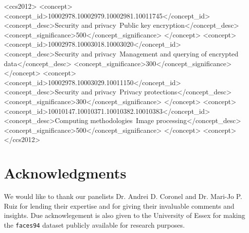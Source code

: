 \documentclass{sig-alternate-05-2015}
\begin{document}
%
%
\begin{CCSXML}
  <ccs2012>
  <concept>
  <concept_id>10002978.10002979.10002981.10011745</concept_id>
  <concept_desc>Security and privacy~Public key encryption</concept_desc>
  <concept_significance>500</concept_significance>
  </concept>
  <concept>
  <concept_id>10002978.10003018.10003020</concept_id>
  <concept_desc>Security and privacy~Management and querying of encrypted data</concept_desc>
  <concept_significance>300</concept_significance>
  </concept>
  <concept>
  <concept_id>10002978.10003029.10011150</concept_id>
  <concept_desc>Security and privacy~Privacy protections</concept_desc>
  <concept_significance>300</concept_significance>
  </concept>
  <concept>
  <concept_id>10010147.10010371.10010382.10010383</concept_id>
  <concept_desc>Computing methodologies~Image processing</concept_desc>
  <concept_significance>500</concept_significance>
  </concept>
  <concept>
  </ccs2012>
\end{CCSXML}


\printccsdesc
{}




\section{Acknowledgments}
We would like to thank our panelists Dr. Andrei D. Coronel and Dr. Mari-Jo P. Ruiz for lending their expertise and for giving their invaluable comments and insights.
Due acknowlegement is also given to the University of Essex for making the \texttt{faces94} dataset publicly available for research purposes.


% 

\balancecolumns

% 
\end{document}
